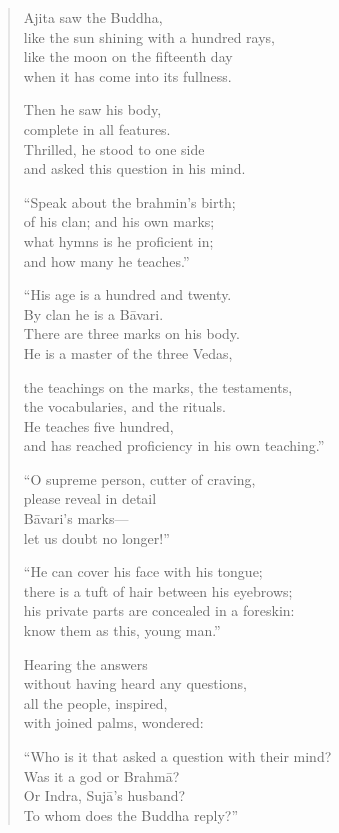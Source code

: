 \documentclass[12pt,openany]{book}%
\begin{document}
\begin{verse}
Ajita saw the Buddha, \\
like the sun shining with a hundred rays, \\
like the moon on the fifteenth day \\
when it has come into its fullness. 

Then he saw his body, \\
complete in all features. \\
Thrilled, he stood to one side \\
and asked this question in his mind. 

“Speak about the brahmin’s birth; \\
of his clan; and his own marks; \\
what hymns is he proficient in; \\
and how many he teaches.” 

“His age is a hundred and twenty. \\
By clan he is a \textsanskrit{Bāvari}. \\
There are three marks on his body. \\
He is a master of the three Vedas, 

the teachings on the marks, the testaments, \\
the vocabularies, and the rituals. \\
He teaches five hundred, \\
and has reached proficiency in his own teaching.” 

“O supreme person, cutter of craving, \\
please reveal in detail \\
\textsanskrit{Bāvari}’s marks—\\
let us doubt no longer!” 

“He can cover his face with his tongue; \\
there is a tuft of hair between his eyebrows; \\
his private parts are concealed in a foreskin: \\
know them as this, young man.” 

Hearing the answers \\
without having heard any questions, \\
all the people, inspired, \\
with joined palms, wondered: 

“Who is it that asked a question with their mind? \\
Was it a god or \textsanskrit{Brahmā}? \\
Or Indra, \textsanskrit{Sujā}’s husband? \\
To whom does the Buddha reply?” 


\end{verse}
\end{document}
